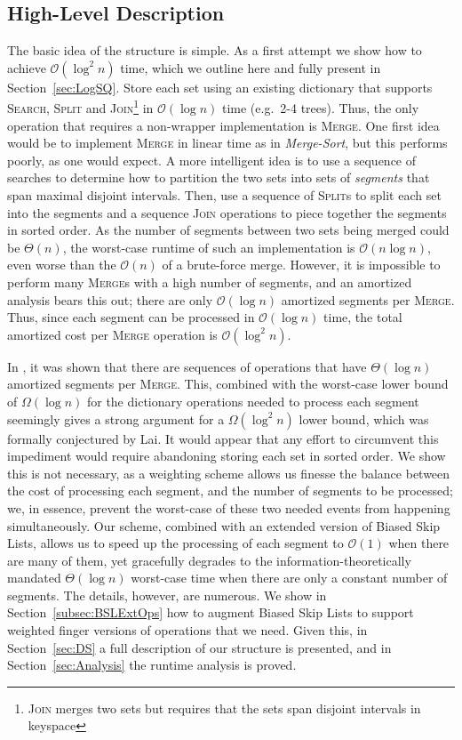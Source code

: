 \documentclass[11pt]{article}
\newcommand{\kwSpl}{Split}
\newcommand{\kwJoinadj}{Join}
\newcommand{\kwUnion}{Merge}
\newcommand{\kwSrc}{Search}
\newcommand{\Spl}{\mbox{\textsc{\kwSpl}}}
\newcommand{\Joinadj}{\mbox{\textsc{\kwJoinadj}}}
\newcommand{\Union}{\mbox{\textsc{\kwUnion{}}}}
\newcommand{\Src}{\mbox{\textsc{\kwSrc}}}
\newcommand{\segments}{{\segment}s}
\newcommand{\segment}{segment}
\begin{document}
\subsection{High-Level Description} 

The basic idea of the structure is simple. As a first attempt we show how to achieve $\mathcal O(\log^2 n)$ time, which we outline here and fully present in Section~\ref{sec:LogSQ}. Store each set using an existing dictionary that supports \Src{}, \Spl{} and \Joinadj{}\footnote{\Joinadj{} merges two sets but requires that the sets span disjoint intervals in keyspace} in $\mathcal O(\log n)$ time (e.g.~2-4 trees). Thus, the only operation that requires a non-wrapper implementation is \Union{}. One first idea would be to implement \Union{} in linear time as in \emph{Merge-Sort}, but this performs poorly, as one would expect. A more intelligent idea is to use a sequence of searches to determine how to partition the two sets into sets of \emph{\segments{}} that span maximal disjoint intervals. Then, use a sequence of \Spl{}s to split each set into the \segments{} and a sequence  \Joinadj{} operations to piece together the \segments{} in sorted order. As the number of \segments{} between two sets being merged could be $\Theta(n)$, the worst-case runtime of such an implementation is $\mathcal O(n \log n)$, even worse than the $\mathcal O(n)$ of a brute-force merge. However, it is impossible to perform many \Union{}s with a high number of \segments{}, and an amortized analysis bears this out; there are only $\mathcal O(\log n)$ amortized \segments{} per \Union{}. Thus, since each \segment{} can be processed in $\mathcal O(\log n)$ time, the total amortized cost per \Union{} operation is $\mathcal O(\log^2 n)$. 

In \cite{klaithesis}, it was shown that there are sequences of operations that have $\Theta(\log n)$ amortized \segments{} per \Union{}. This, combined with the worst-case lower bound 
of $\Omega(\log n)$ for the dictionary operations needed to process each \segment{} seemingly gives a strong argument for a $\Omega(\log^2 n)$ lower bound, which was formally conjectured by Lai. 
It would appear that any effort to circumvent this impediment would require abandoning storing each set in sorted order. 
We show this is not necessary, as a weighting scheme allows us finesse the balance between the cost of processing each \segment{}, and the number of \segments{} to be processed; we, in essence, prevent the worst-case of these two needed events from happening simultaneously. 
Our scheme, combined with an extended version of Biased Skip Lists, allows us 
to speed up the 
processing of each \segment{} to $\mathcal O(1)$ when there are many of them, yet gracefully degrades to the information-theoretically mandated $\Theta(\log n)$ worst-case time when there are only a constant number of \segments{}. The details, however, are numerous. We show in Section~\ref{subsec:BSLExtOps} how to augment Biased Skip Lists to support weighted finger versions of operations that we need. Given this, in Section~\ref{sec:DS} a full description of our structure is presented, and in Section~\ref{sec:Analysis} the runtime analysis is proved. 
\end{document}
